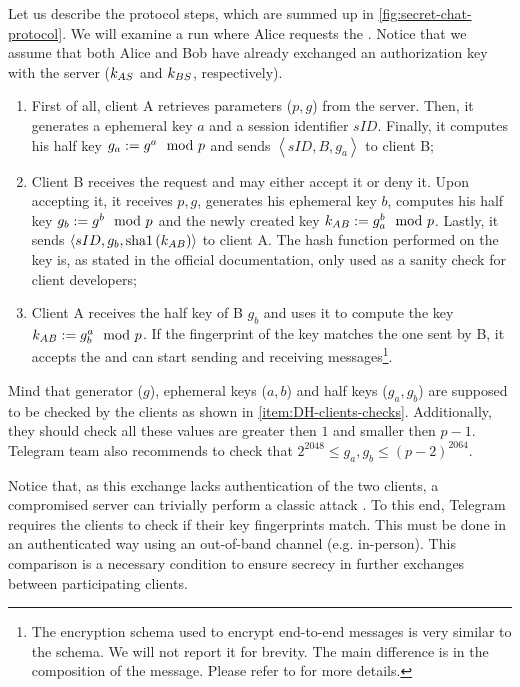 Let us describe the protocol steps, which are summed up in \cref{fig:secret-chat-protocol}. We will examine a run where Alice requests the \schat{}. Notice that we assume that both Alice and Bob have already exchanged an authorization key with the server ($k_{AS}$ and $k_{BS}$, respectively).

\begin{enumerate}
  \item{First of all, client A retrieves \DiHe{} parameters ($p, g$) from the server. Then, it generates a \DiHe{} ephemeral key $a$ and a session identifier $sID$. Finally, it computes his \DiHe{} half key $g_a:= g^a \mod{p}$ and sends $\left<sID, B, g_a\right>$ to client B;}
  \item{Client B receives the \schat{} request and may either accept it or deny it. Upon accepting it, it receives $p, g$, generates his ephemeral key $b$, computes his half key $g_b:= g^b \mod{p}$ and the newly created \schat{} key $k_{AB}:= g_a^b \mod{p}$. Lastly, it sends $\left<sID, g_b, \mbox{sha1}\left(k_{AB}\right)\right>$ to client A. The hash function performed on the key is, as stated in the official documentation, only used as a sanity check for client developers;}
  \item{Client A receives the half key of B $g_b$ and uses it to compute the \schat{} key $k_{AB}:= g_b^a \mod{p}$. If the fingerprint of the key matches the one sent by B, it accepts the \schat{} and can start sending and receiving messages\footnote{The encryption schema used to encrypt end-to-end messages is very similar to the \cchat{} schema. We will not report it for brevity. The main difference is in the composition of the message. Please refer to \cite{Telegram-EndToEnd} for more details.}.}
\end{enumerate}

Mind that \DiHe{} generator ($g$), ephemeral keys ($a, b$) and half keys ($g_a, g_b$) are supposed to be checked by the clients as shown in \cref{item:DH-clients-checks}. Additionally, they should check all these values are greater then $1$ and smaller then $p-1$. Telegram team also recommends to check that $2^{2048}\leq g_a, g_b \leq \left(p-2\right)^{2064}$.

Notice that, as this exchange lacks authentication of the two clients, a compromised server can trivially perform a classic \DiHe{} \mitm{} attack \cite{DH-MITM}. To this end, Telegram requires the clients to check if their key fingerprints match. This must be done in an authenticated way using an out-of-band channel (e.g. in-person). This comparison is a necessary condition to ensure secrecy in further exchanges between participating clients.

